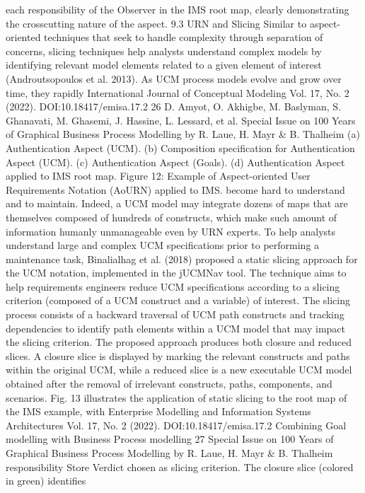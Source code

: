 each responsibility of the Observer in the IMS root
map, clearly demonstrating the crosscutting nature
of the aspect.
9.3 URN and Slicing
Similar to aspect-oriented techniques that seek
to handle complexity through separation of concerns, slicing techniques help analysts understand
complex models by identifying relevant model
elements related to a given element of interest
(Androutsopoulos et al. 2013). As UCM process
models evolve and grow over time, they rapidly
International Journal of Conceptual Modeling
Vol. 17, No. 2 (2022). DOI:10.18417/emisa.17.2
26 D. Amyot, O. Akhigbe, M. Baslyman, S. Ghanavati, M. Ghasemi, J. Hassine, L. Lessard, et al.
Special Issue on 100 Years of Graphical Business Process Modelling by R. Laue, H. Mayr & B. Thalheim
(a) Authentication Aspect (UCM).
(b) Composition specification for Authentication Aspect (UCM). (c) Authentication Aspect (Goals).
(d) Authentication Aspect applied to IMS root map.
Figure 12: Example of Aspect-oriented User Requirements Notation (AoURN) applied to IMS.
become hard to understand and to maintain. Indeed, a UCM model may integrate dozens of
maps that are themselves composed of hundreds
of constructs, which make such amount of information humanly unmanageable even by URN
experts. To help analysts understand large and
complex UCM specifications prior to performing a maintenance task, Binalialhag et al. (2018)
proposed a static slicing approach for the UCM
notation, implemented in the jUCMNav tool. The
technique aims to help requirements engineers
reduce UCM specifications according to a slicing
criterion (composed of a UCM construct and a
variable) of interest. The slicing process consists
of a backward traversal of UCM path constructs
and tracking dependencies to identify path elements within a UCM model that may impact the
slicing criterion. The proposed approach produces
both closure and reduced slices. A closure slice is
displayed by marking the relevant constructs and
paths within the original UCM, while a reduced
slice is a new executable UCM model obtained
after the removal of irrelevant constructs, paths,
components, and scenarios.
Fig. 13 illustrates the application of static slicing to the root map of the IMS example, with
Enterprise Modelling and Information Systems Architectures
Vol. 17, No. 2 (2022). DOI:10.18417/emisa.17.2
Combining Goal modelling with Business Process modelling 27
Special Issue on 100 Years of Graphical Business Process Modelling by R. Laue, H. Mayr & B. Thalheim
responsibility Store Verdict chosen as slicing criterion. The closure slice (colored in green) identifies
